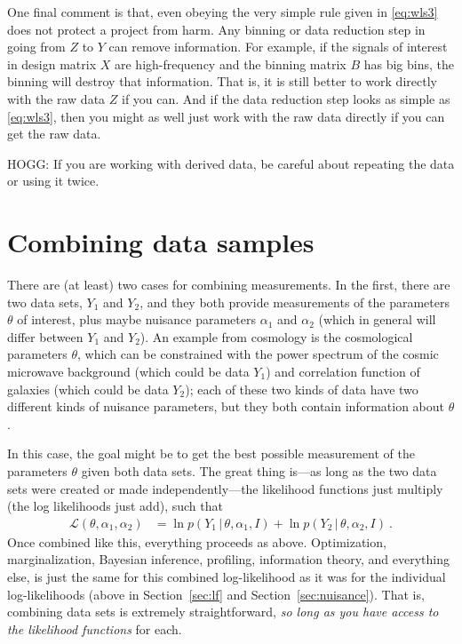 \documentclass{article}
\newcommand{\sectionname}{Section}
\newcommand{\secref}[1]{\sectionname~\ref{#1}}
\newcommand{\given}{\,|\,}
\begin{document}
One final comment is that, even obeying the very simple rule given in \eqref{eq:wls3} does not protect a project from harm.
Any binning or data reduction step in going from $Z$ to $Y$ can remove information.
For example, if the signals of interest in design matrix $X$ are high-frequency and the binning matrix $B$ has big bins, the binning will destroy that information.
That is, it is still better to work directly with the raw data $Z$ if you can.
And if the data reduction step looks as simple as \eqref{eq:wls3}, then you might as well just work with the raw data directly if you can get the raw data.

HOGG: If you are working with derived data, be careful about repeating the data or using it twice.

\section{Combining data samples}\label{sec:combining}
There are (at least) two cases for combining measurements.
In the first, there are two data sets, $Y_1$ and $Y_2$, and they both provide measurements of the parameters $\theta$ of interest, plus maybe nuisance parameters $\alpha_1$ and $\alpha_2$ (which in general will differ between $Y_1$ and $Y_2$).
An example from cosmology is the cosmological parameters $\theta$, which can be constrained with the power spectrum of the cosmic microwave background (which could be data $Y_1$) and correlation function of galaxies (which could be data $Y_2$); each of these two kinds of data have two different kinds of nuisance parameters, but they both contain information about $\theta$.

In this case, the goal might be to get the best possible measurement of the parameters $\theta$ given both data sets.
The great thing is---as long as the two data sets were created or made independently---the likelihood functions just multiply (the log likelihoods just add), such that
\begin{align}
    \mathscr{L}(\theta,\alpha_1,\alpha_2) &= \ln p(Y_1\given\theta,\alpha_1,I) + \ln p(Y_2\given\theta,\alpha_2,I) ~.\label{eq:combineLFs}
\end{align}
Once combined like this, everything proceeds as above.
Optimization, marginalization, Bayesian inference, profiling, information theory, and everything else, is just the same for this combined log-likelihood as it was for the individual log-likelihoods (above in \secref{sec:lf} and \secref{sec:nuisance}).
That is, combining data sets is extremely straightforward, \emph{so long as you have access to the likelihood functions} for each.
\end{document}
